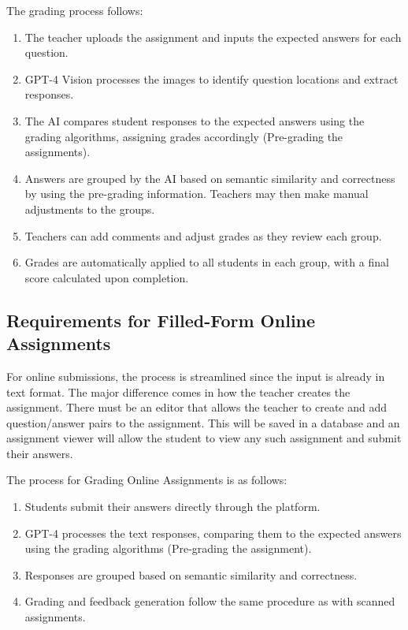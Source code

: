 \documentclass[ms,twoside,print]{nuthesis}
\begin{document}
The grading process follows:

\begin{enumerate}
    \item The teacher uploads the assignment and inputs the expected answers for each question.
    \item GPT-4 Vision processes the images to identify question locations and extract responses.
    \item The AI compares student responses to the expected answers using the grading algorithms, assigning grades accordingly (Pre-grading the assignments). %
    \item Answers are grouped by the AI based on semantic similarity and correctness by using the pre-grading information. Teachers may then make manual adjustments to the groups.
    \item Teachers can add comments and adjust grades as they review each group.
    \item Grades are automatically applied to all students in each group, with a final score calculated upon completion.
\end{enumerate}

\subsection{Requirements for Filled-Form Online Assignments}

For online submissions, the process is streamlined since the input is already in text format. The major difference comes in how the teacher creates the assignment. There must be an editor that allows the teacher to create and add question/answer pairs to the assignment. This will be saved in a database and an assignment viewer will allow the student to view any such assignment and submit their answers.

The process for Grading Online Assignments is as follows:

\begin{enumerate}
    \item Students submit their answers directly through the platform.
    \item GPT-4 processes the text responses, comparing them to the expected answers using the grading algorithms (Pre-grading the assignment).
    \item Responses are grouped based on semantic similarity and correctness.
    \item Grading and feedback generation follow the same procedure as with scanned assignments.
\end{enumerate}
\end{document}

